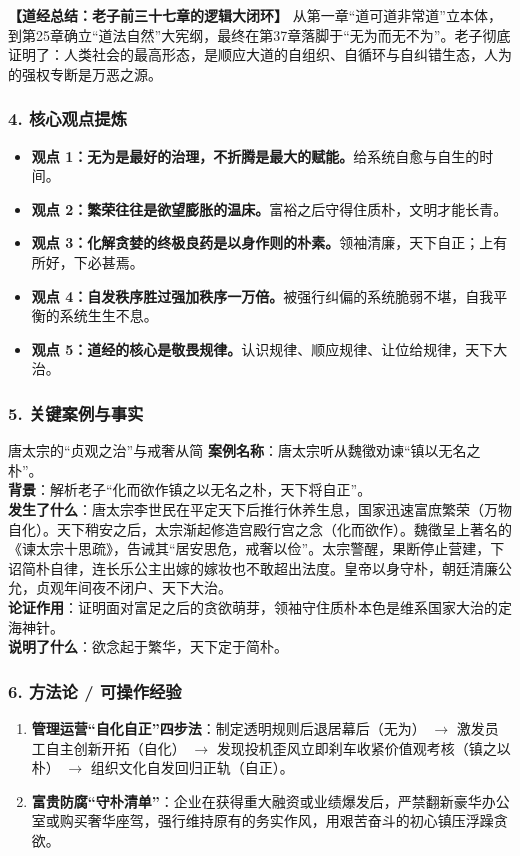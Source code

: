 \noindent\textbf{【道经总结：老子前三十七章的逻辑大闭环】}
从第一章“道可道非常道”立本体，到第25章确立“道法自然”大宪纲，最终在第37章落脚于“无为而无不为”。老子彻底证明了：人类社会的最高形态，是顺应大道的自组织、自循环与自纠错生态，人为的强权专断是万恶之源。

\subsubsection{4. 核心观点提炼}
\begin{itemize}
    \item \textbf{观点 1：无为是最好的治理，不折腾是最大的赋能。}给系统自愈与自生的时间。
    \item \textbf{观点 2：繁荣往往是欲望膨胀的温床。}富裕之后守得住质朴，文明才能长青。
    \item \textbf{观点 3：化解贪婪的终极良药是以身作则的朴素。}领袖清廉，天下自正；上有所好，下必甚焉。
    \item \textbf{观点 4：自发秩序胜过强加秩序一万倍。}被强行纠偏的系统脆弱不堪，自我平衡的系统生生不息。
    \item \textbf{观点 5：道经的核心是敬畏规律。}认识规律、顺应规律、让位给规律，天下大治。
\end{itemize}

\subsubsection{5. 关键案例与事实}
\begin{CaseBox}{唐太宗的“贞观之治”与戒奢从简}
\textbf{案例名称}：唐太宗听从魏徵劝谏“镇以无名之朴”。\\
\textbf{背景}：解析老子“化而欲作镇之以无名之朴，天下将自正”。\\
\textbf{发生了什么}：唐太宗李世民在平定天下后推行休养生息，国家迅速富庶繁荣（万物自化）。天下稍安之后，太宗渐起修造宫殿行宫之念（化而欲作）。魏徵呈上著名的《谏太宗十思疏》，告诫其“居安思危，戒奢以俭”。太宗警醒，果断停止营建，下诏简朴自律，连长乐公主出嫁的嫁妆也不敢超出法度。皇帝以身守朴，朝廷清廉公允，贞观年间夜不闭户、天下大治。\\
\textbf{论证作用}：证明面对富足之后的贪欲萌芽，领袖守住质朴本色是维系国家大治的定海神针。\\
\textbf{说明了什么}：欲念起于繁华，天下定于简朴。
\end{CaseBox}

\subsubsection{6. 方法论 / 可操作经验}
\begin{enumerate}
    \item \textbf{管理运营“自化自正”四步法}：制定透明规则后退居幕后（无为） $\rightarrow$ 激发员工自主创新开拓（自化） $\rightarrow$ 发现投机歪风立即刹车收紧价值观考核（镇之以朴） $\rightarrow$ 组织文化自发回归正轨（自正）。
    \item \textbf{富贵防腐“守朴清单”}：企业在获得重大融资或业绩爆发后，严禁翻新豪华办公室或购买奢华座驾，强行维持原有的务实作风，用艰苦奋斗的初心镇压浮躁贪欲。
\end{enumerate}

